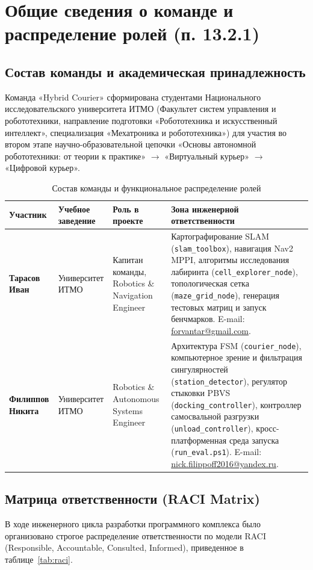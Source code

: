 \documentclass[a4paper,11pt]{article}
\begin{document}
\tableofcontents
\newpage

\section{Общие сведения о команде и распределение ролей (п. 13.2.1)}

\subsection{Состав команды и академическая принадлежность}
Команда «Hybrid Courier» сформирована студентами Национального исследовательского университета ИТМО (Факультет систем управления и робототехники, направление подготовки «Робототехника и искусственный интеллект», специализация «Мехатроника и робототехника») для участия во втором этапе научно-образовательной цепочки «Основы автономной робототехники: от теории к практике» $\to$ «Виртуальный курьер» $\to$ «Цифровой курьер».

\begin{table}[htbp]
\centering
\small
\begin{tabularx}{\textwidth}{p{3.2cm}p{3.0cm}p{3.8cm}X}
\toprule
\textbf{Участник} & \textbf{Учебное заведение} & \textbf{Роль в проекте} & \textbf{Зона инженерной ответственности} \\
\midrule
\textbf{Тарасов Иван} & Университет ИТМО & Капитан команды, Robotics \& Navigation Engineer & Картографирование SLAM (\texttt{slam\_toolbox}), навигация Nav2 MPPI, алгоритмы исследования лабиринта (\texttt{cell\_explorer\_node}), топологическая сетка (\texttt{maze\_grid\_node}), генерация тестовых матриц и запуск бенчмарков. E-mail: \url{forvantar@gmail.com}. \\
\midrule
\textbf{Филиппов Никита} & Университет ИТМО & Robotics \& Autonomous Systems Engineer & Архитектура FSM (\texttt{courier\_node}), компьютерное зрение и фильтрация сингулярностей (\texttt{station\_detector}), регулятор стыковки PBVS (\texttt{docking\_controller}), контроллер самосвальной разгрузки (\texttt{unload\_controller}), кросс-платформенная среда запуска (\texttt{run\_eval.ps1}). E-mail: \url{nick.filippoff2016@yandex.ru}. \\
\bottomrule
\end{tabularx}
\caption{Состав команды и функциональное распределение ролей}
\label{tab:team_roles}
\end{table}

\subsection{Матрица ответственности (RACI Matrix)}
В ходе инженерного цикла разработки программного комплекса было организовано строгое распределение ответственности по модели RACI (Responsible, Accountable, Consulted, Informed), приведенное в таблице~\ref{tab:raci}.
\end{document}
